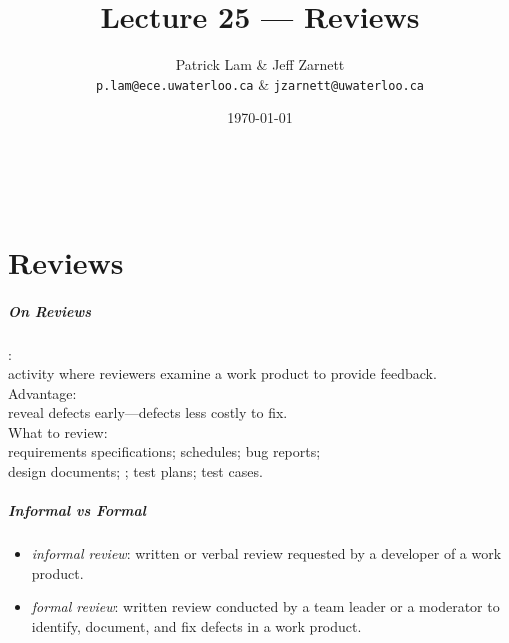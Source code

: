

\title{Lecture 25 --- Reviews}

\author{Patrick Lam \& Jeff Zarnett \\ \small \texttt{p.lam@ece.uwaterloo.ca} \& \texttt{jzarnett@uwaterloo.ca}}
\date{\today}



\begin{frame}
  \titlepage

  \vfill
  \begin{center}
    \\
                  {\tiny\CcNote{\CcLongnameByNcSa}}
                  \vspace*{-2.5ex}
  \end{center}

\end{frame}

\part{Reviews}
\frame{\partpage}

\begin{frame}
\frametitle{On Reviews}

\begin{changemargin}{1cm}

: \\activity where reviewers examine a work product
to provide feedback.\\[1em]

Advantage: \\
reveal defects early---defects less costly to fix.  \\[1em]

What to review:\\
requirements specifications; schedules; bug reports; \\design documents;
; test plans; test cases.

\end{changemargin}

\end{frame}

\begin{frame}
\frametitle{Informal vs Formal}

\large
\begin{changemargin}{1cm}
\begin{itemize}
\item \emph{informal review}: written or verbal review
  requested by a developer of a work product.\\[1em]
\item \emph{formal review}: written review conducted by a team
  leader or a moderator to identify, document,
  and fix defects in a work product.  
\end{itemize}
\end{changemargin}

\end{frame}

